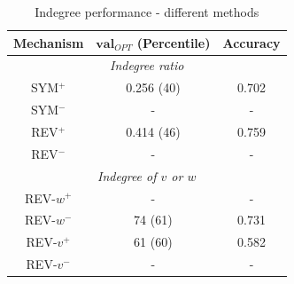 \documentclass[conference]{IEEEtran}
\begin{document}
\begin{table}[!t]
\renewcommand{\arraystretch}{1.3}
\caption{Indegree performance - different methods}
\label{table_recresults_indeg}
\centering
\begin{tabular}{|c||c|c|}
\hline
\bf{Mechanism} & $\mathbf{val}_{OPT}$ (Percentile) & \bf{Accuracy} \\
\hline
\multicolumn{3}{|c|}{\emph{Indegree ratio}} \\
\hline
SYM$^+$ & 0.256 (40) & 0.702 \\
SYM$^-$ & - & - \\
REV$^+$ & 0.414 (46) & 0.759 \\
REV$^-$ & - & - \\
\hline
\multicolumn{3}{|c|}{\emph{Indegree of $v$ or $w$}} \\
\hline
REV-$w^+$ & - & - \\
REV-$w^-$ & 74 (61) & 0.731 \\
REV-$v^+$ &  61 (60) & 0.582 \\
REV-$v^-$ & - & - \\
\hline
\end{tabular}
\end{table}
\end{document}

